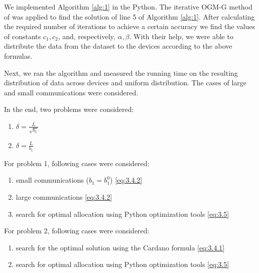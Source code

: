 \documentclass{article}
\begin{document}

 We implemented Algorithm \ref{alg:1} in the Python. The iterative OGM-G method of \cite{kim2021optimizing} was applied to find the solution of line 5 of Algorithm \ref{alg:1}. After calculating the required number of iterations to achieve a certain accuracy we find the values of constants $c_1, c_2$, and, respectively, $\alpha, \beta$. With their help, we were able to distribute the data from the dataset to the devices according to the above formulas. 

Next, we ran the algorithm and measured the running time on the resulting distribution of data across devices and uniform distribution. The cases of large and small communications were considered. 

In the end, two problems were considered: 
\begin{enumerate}
    \item $\delta = \frac{L}{\sqrt{b_1}}$ 
    \item $\delta = \frac{L}{b_1}$
\end{enumerate}

For problem 1, following cases were considered:
\begin{enumerate}
    \item small communications ($b_1 = b_1^0$) \eqref{eq:3.4.2}
    \item large communications \eqref{eq:3.4.2}
    \item search for optimal allocation using Python optimization tools \eqref{eq:3.5}
\end{enumerate}

For problem 2, following cases were considered:
\begin{enumerate}
    \item search for the optimal solution using the Cardano formula \eqref{eq:3.4.1}
    \item search for optimal allocation using Python optimization tools \eqref{eq:3.5}
\end{enumerate}
\end{document}
